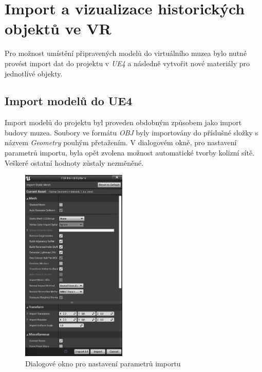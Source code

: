 \documentclass[a4paper, 12pt]{report}
\begin{document}
\chapter{Import a vizualizace historických objektů ve VR}
Pro možnost umístění připravených modelů do virtuálního muzea bylo nutné provést import dat do projektu v \textit{UE4} a následně vytvořit nové materiály pro jednotlivé objekty. 

\section{Import modelů do UE4}
Import modelů do projektu byl proveden obdobným způsobem jako import budovy muzea. Soubory ve formátu \textit{OBJ} byly importovány do příslušné složky s názvem \textit{Geometry} pouhým přetažením. V dialogovém okně, pro nastavení parametrů importu, byla opět zvolena možnost automatické tvorby kolizní sítě. Veškeré ostatní hodnoty zůstaly nezměněné. 

\begin{figure}[h!]
	\centering
	\includegraphics[width=5cm]{import_UE.jpg}
	\caption{Dialogové okno pro nastavení parametrů importu}
\end{figure}
\end{document}
